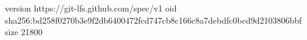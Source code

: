 version https://git-lfs.github.com/spec/v1
oid sha256:bd258f0270b3e9f2db6400472fcd747cb8c166c8a7debdfc0bcd9d2103806bbf
size 21800
